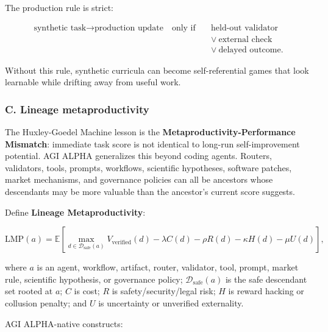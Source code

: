 \documentclass[
  11pt,
]{article}
\begin{document}
The production rule is strict:

\[
\begin{aligned}
\text{synthetic task} \rightarrow \text{production update}
\quad\text{only if}\quad&
\text{held-out validator}\\
&\lor\ \text{external check}\\
&\lor\ \text{delayed outcome}.
\end{aligned}
\]

Without this rule, synthetic curricula can become self-referential games
that look learnable while drifting away from useful work.

\subsubsection{C. Lineage
metaproductivity}\label{c.-lineage-metaproductivity}

The Huxley-Goedel Machine lesson is the
\textbf{Metaproductivity-Performance Mismatch}: immediate task score is
not identical to long-run self-improvement potential. AGI ALPHA
generalizes this beyond coding agents. Routers, validators, tools,
prompts, workflows, scientific hypotheses, software patches, market
mechanisms, and governance policies can all be ancestors whose
descendants may be more valuable than the ancestor's current score
suggests.

Define \textbf{Lineage Metaproductivity}:

\[
\mathrm{LMP}(a)=
\mathbb{E}\left[
\max_{d\in\mathcal{D}_{\mathrm{safe}}(a)}
V_{\mathrm{verified}}(d)
-\lambda C(d)
-\rho R(d)
-\kappa H(d)
-\mu U(d)
\right],
\]

where \(a\) is an agent, workflow, artifact, router, validator, tool,
prompt, market rule, scientific hypothesis, or governance policy;
\(\mathcal{D}_{\mathrm{safe}}(a)\) is the safe descendant set rooted at
\(a\); \(C\) is cost; \(R\) is safety/security/legal risk; \(H\) is
reward hacking or collusion penalty; and \(U\) is uncertainty or
unverified externality.

AGI ALPHA-native constructs:
\end{document}
